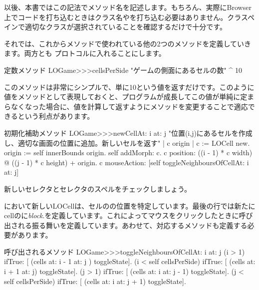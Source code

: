 \documentclass[a4paper,10pt,twoside]{book}
\begin{document}

以後、本書ではこの記法でメソッド名を記述します。もちろん、実際にBrowser上でコードを打ち込むときはクラス名や\ct{>>>}を打ち込む必要はありません。クラスペインで適切なクラスが選択されていることを確認するだけで十分です。

それでは、これからメソッドで使われている他の2つのメソッドを定義していきます。両方とも プロトコルに入れることにします。

\begin{method}[sbegamecellsperside]{定数メソッド}
LOGame>>>cellsPerSide
   "ゲームの側面にあるセルの数"
   ^ 10
\end{method}

このメソッドは非常にシンプルで、単に10という値を返すだけです。このように値をメソッドとして表現しておくと、プログラムが成長してこの値が単純に定まらなくなった場合に、値を計算して返すようにメソッドを変更することで適応できるという利点があります。

\begin{method}[newCellAt:at:]{初期化補助メソッド}
LOGame>>>newCellAt: i at: j
   "位置(i,j)にあるセルを作成し、適切な画面の位置に追加。新しいセルを返す"
   | c origin |
   c := LOCell new.
   origin := self innerBounds origin.
   self addMorph: c.
   c position: ((i - 1) * c width) @ ((j - 1) * c height) + origin.
   c mouseAction: [self toggleNeighboursOfCellAt: i at: j]
\end{method}


新しいセレクタとセレクタのスペルをチェックしましょう。

 において新しいLOCellは、セルのの位置を特定しています。最後の行では新たにcellのに\emph{block}\mbox{.}を定義しています。これによってマウスをクリックしたときに呼び出される振る舞いを定義しています。あわせて、対応するメソッドも定義する必要があります。

\begin{method}[toggleNeighboursOfCellAt:at:]{呼び出されるメソッド}
LOGame>>>toggleNeighboursOfCellAt: i at: j
   (i > 1) ifTrue: [ (cells at: i - 1 at: j ) toggleState].
   (i < self cellsPerSide) ifTrue: [ (cells at: i + 1 at: j) toggleState].
   (j > 1) ifTrue: [ (cells at: i  at: j - 1) toggleState].
   (j < self cellsPerSide) ifTrue: [ (cells at: i at: j + 1) toggleState].
\end{method}
\end{document}
